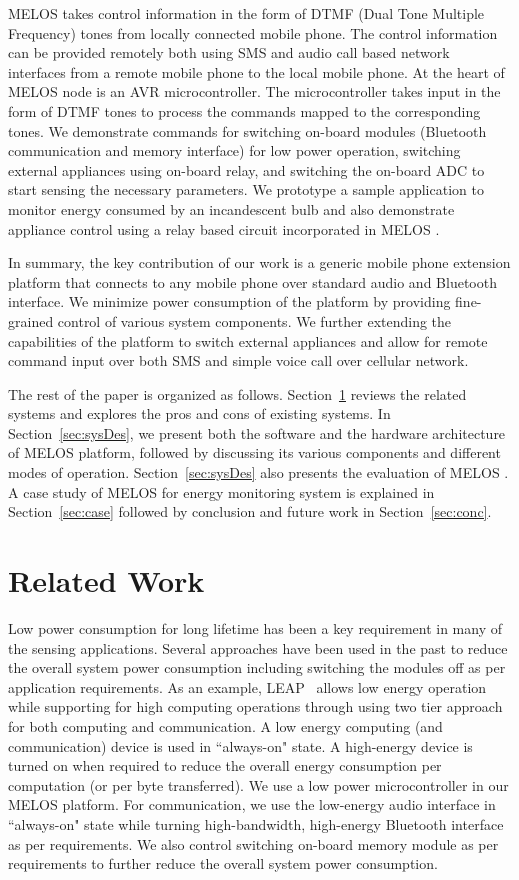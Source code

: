 \documentclass[10pt]{sigplan-proc-varsize}
\newcommand{\secref}[1]{Section~\ref{#1}}
\newcommand{\melos}{MELOS }
\begin{document}
\melos takes control information in the form of DTMF (Dual Tone Multiple Frequency) tones from locally connected mobile phone. The control information can be provided remotely both using SMS and audio call based network interfaces from a remote mobile phone to the local mobile phone. At the heart of \melos node is an AVR microcontroller. The microcontroller takes input in the form of DTMF tones to process the commands mapped to the corresponding tones. We demonstrate commands for switching on-board modules (Bluetooth communication and memory interface) for low power operation, switching external appliances using on-board relay, and switching the on-board ADC to start sensing the necessary parameters. We prototype a sample application to monitor energy consumed by an incandescent bulb and also demonstrate appliance control using a relay based circuit incorporated in \melos .  

In summary, the key contribution of our work is a generic mobile phone extension platform that connects to any mobile phone over standard audio and Bluetooth interface. We minimize power consumption of the platform by providing fine-grained control of various system components. We further extending the capabilities of the platform to switch external appliances and allow for remote command input over both SMS and simple voice call over cellular network. 

The rest of the paper is organized as follows. \secref{sec:rw} reviews the related systems and explores the pros and cons of existing systems. In \secref{sec:sysDes}, we present both the software and the hardware architecture of \melos platform, followed by discussing its various components and different modes of operation. \secref{sec:sysDes} also presents the evaluation of \melos. A case study of \melos for energy monitoring system is explained in \secref{sec:case} followed by conclusion and future work in \secref{sec:conc}.

\section{Related Work}
\label{sec:rw}
Low power consumption for long lifetime has been a key requirement in many of the sensing applications. Several approaches have been used in the past to reduce the overall system power consumption including switching the modules off as per application requirements. As an example, LEAP~\cite{LEAP} allows low energy operation while supporting for high computing operations through using two tier approach for both computing and communication. A low energy computing (and communication) device is used in ``always-on" state. A high-energy device is turned on when required to reduce the overall energy consumption per computation (or per byte transferred). We use a low power microcontroller in our \melos platform. For communication, we use the low-energy audio interface in ``always-on" state while turning high-bandwidth, high-energy Bluetooth interface as per requirements. We also control switching on-board memory module as per requirements to further reduce the overall system power consumption. 
\end{document}
